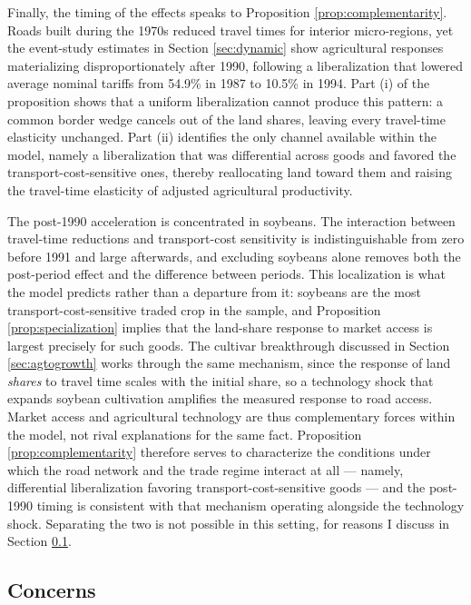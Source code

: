 \documentclass[11pt]{article}
\begin{document}
Finally, the timing of the effects speaks to Proposition \ref{prop:complementarity}. Roads built during the 1970s reduced travel times for interior micro-regions, yet the event-study estimates in Section \ref{sec:dynamic} show agricultural responses materializing disproportionately after 1990, following a liberalization that lowered average nominal tariffs from 54.9\% in 1987 to 10.5\% in 1994. Part (i) of the proposition shows that a uniform liberalization cannot produce this pattern: a common border wedge cancels out of the land shares, leaving every travel-time elasticity unchanged. Part (ii) identifies the only channel available within the model, namely a liberalization that was differential across goods and favored the transport-cost-sensitive ones, thereby reallocating land toward them and raising the travel-time elasticity of adjusted agricultural productivity.

The post-1990 acceleration is concentrated in soybeans. The interaction between travel-time reductions and transport-cost sensitivity is indistinguishable from zero before 1991 and large afterwards, and excluding soybeans alone removes both the post-period effect and the difference between periods. This localization is what the model predicts rather than a departure from it: soybeans are the most transport-cost-sensitive traded crop in the sample, and Proposition \ref{prop:specialization} implies that the land-share response to market access is largest precisely for such goods. The cultivar breakthrough discussed in Section \ref{sec:agtogrowth} works through the same mechanism, since the response of land \emph{shares} to travel time scales with the initial share, so a technology shock that expands soybean cultivation amplifies the measured response to road access. Market access and agricultural technology are thus complementary forces within the model, not rival explanations for the same fact. Proposition \ref{prop:complementarity} therefore serves to characterize the conditions under which the road network and the trade regime interact at all — namely, differential liberalization favoring transport-cost-sensitive goods — and the post-1990 timing is consistent with that mechanism operating alongside the technology shock. Separating the two is not possible in this setting, for reasons I discuss in Section \ref{sec:concerns}.

\subsection{Concerns}
\label{sec:concerns}
\end{document}
